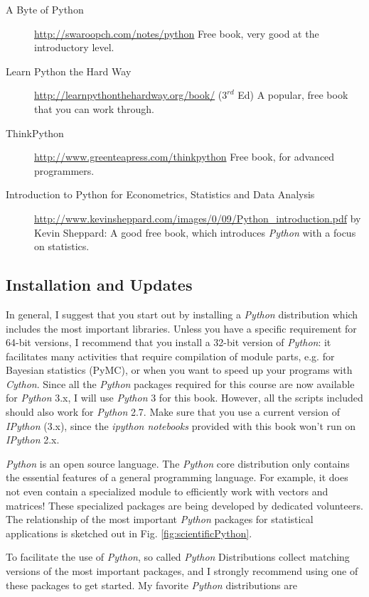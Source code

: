 \begin{description}
  \item[A Byte of Python] \url{http://swaroopch.com/notes/python} Free book, very good at the introductory level.
  \item[Learn Python the Hard Way] \url{http://learnpythonthehardway.org/book/} ($3^{rd}$ Ed) A popular, free book that you can work through.
  \item[ThinkPython] \url{http://www.greenteapress.com/thinkpython} Free book, for advanced programmers.
  \item[Introduction to Python for Econometrics, Statistics and Data Analysis] \url{http://www.kevinsheppard.com/images/0/09/Python_introduction.pdf} by Kevin Sheppard: A
      good free book, which introduces \emph{Python} with a focus on statistics.
\end{description}

\subsection{Installation and Updates}

In general, I suggest that you start out by installing a \emph{Python} distribution which includes the most important libraries. Unless you have a specific requirement for 64-bit versions, I recommend that you install a 32-bit version of \emph{Python}: it facilitates many activities that require compilation of module parts, e.g. for Bayesian statistics (PyMC), or when you want to speed up your programs with \emph{Cython}. Since all the \emph{Python} packages required for this course are now available for \emph{Python} 3.x, I will use \emph{Python} 3 for this book. However, all the scripts included should also work for \emph{Python} 2.7. Make sure that you use a current version of \emph{IPython} (3.x), since the \emph{ipython notebooks} provided with this book won't run on \emph{IPython} 2.x.

\emph{Python} is an open source language. The \emph{Python} core distribution only contains the essential features of a general programming language. For example, it does not even contain a specialized module to efficiently work with vectors and matrices! These specialized packages are being developed by dedicated volunteers. The relationship of the most important \emph{Python} packages for statistical applications is sketched out in Fig. \ref{fig:scientificPython}.

To facilitate the use of \emph{Python}, so called \emph{Python} Distributions collect matching versions of the most important packages, and I strongly recommend using one of these packages to get started. My favorite \emph{Python} distributions  are

